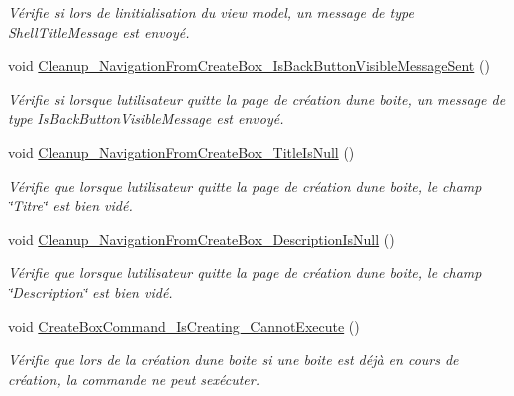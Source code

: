 \begin{DoxyCompactItemize}
\begin{DoxyCompactList}\small\item\em Vérifie si lors de l\textquotesingle{}initialisation du view model, un message de type Shell\+Title\+Message est envoyé. \end{DoxyCompactList}\item 
void \hyperlink{class_boxes_1_1_tests_1_1_create_box_view_model_tests_a6c22cfcf1332b17894e3e60c3ff7961f}{Cleanup\+\_\+\+Navigation\+From\+Create\+Box\+\_\+\+Is\+Back\+Button\+Visible\+Message\+Sent} ()
\begin{DoxyCompactList}\small\item\em Vérifie si lorsque l\textquotesingle{}utilisateur quitte la page de création d\textquotesingle{}une boite, un message de type Is\+Back\+Button\+Visible\+Message est envoyé. \end{DoxyCompactList}\item 
void \hyperlink{class_boxes_1_1_tests_1_1_create_box_view_model_tests_acccc1b16f201142fa8d9a336fd7680f0}{Cleanup\+\_\+\+Navigation\+From\+Create\+Box\+\_\+\+Title\+Is\+Null} ()
\begin{DoxyCompactList}\small\item\em Vérifie que lorsque l\textquotesingle{}utilisateur quitte la page de création d\textquotesingle{}une boite, le champ \char`\"{}\+Titre\char`\"{} est bien vidé. \end{DoxyCompactList}\item 
void \hyperlink{class_boxes_1_1_tests_1_1_create_box_view_model_tests_a1900608827ee7d9726b9a2188b884676}{Cleanup\+\_\+\+Navigation\+From\+Create\+Box\+\_\+\+Description\+Is\+Null} ()
\begin{DoxyCompactList}\small\item\em Vérifie que lorsque l\textquotesingle{}utilisateur quitte la page de création d\textquotesingle{}une boite, le champ \char`\"{}\+Description\char`\"{} est bien vidé. \end{DoxyCompactList}\item 
void \hyperlink{class_boxes_1_1_tests_1_1_create_box_view_model_tests_a132cbc9e8ed6598e75e8edca409c579f}{Create\+Box\+Command\+\_\+\+Is\+Creating\+\_\+\+Cannot\+Execute} ()
\begin{DoxyCompactList}\small\item\em Vérifie que lors de la création d\textquotesingle{}une boite si une boite est déjà en cours de création, la commande ne peut s\textquotesingle{}exécuter. \end{DoxyCompactList}\item 

\end{DoxyCompactItemize}
